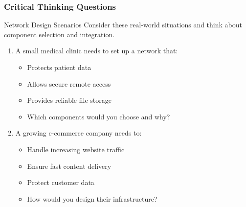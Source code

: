 \documentclass{beamer}
\begin{document}
\begin{frame}
    \frametitle{Critical Thinking Questions}
    
    \begin{alertblock}{Network Design Scenarios}
        Consider these real-world situations and think about component selection and integration.
    \end{alertblock}
    
    \begin{enumerate}
        \item A small medical clinic needs to set up a network that:
        \begin{itemize}
            \item Protects patient data
            \item Allows secure remote access
            \item Provides reliable file storage
            \item Which components would you choose and why?
        \end{itemize}
        
        \item A growing e-commerce company needs to:
        \begin{itemize}
            \item Handle increasing website traffic
            \item Ensure fast content delivery
            \item Protect customer data
            \item How would you design their infrastructure?
        \end{itemize}
    \end{enumerate}
\end{frame}
\end{document}
